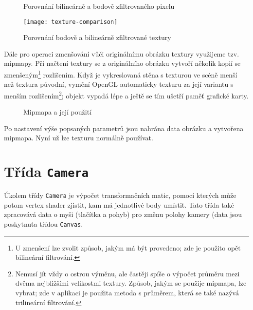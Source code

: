 \documentclass[a4paper, 11pt]{report}
\begin{document}
\begin{figure}[h]
    \centering
    \qquad
    \caption[Porovnání bodově a bilineárně zfiltrovaného pixelu]{Porovnání bilineárně a bodově zfiltrovaného pixelu~\cite{pic:colorfilter}}
\end{figure}
\begin{figure}[H]
    \centering
    \texttt{[image: texture-comparison]}
    \caption[Porovnání bodově a bilineárně zfiltrované textury]{Porovnání bodově a bilineárně zfiltrované textury~\cite{pic:texfilter}}
\end{figure}

Dále pro operaci zmenšování vůči originálnímu obrázku textury využijeme tzv. mipmapy. Při načtení textury se z originálního obrázku vytvoří několik kopií se zmenšeným\footnote{U zmenšení lze zvolit způsob, jakým má být provedeno; zde je použito opět bilineární filtrování.} rozlišením. Když je vykreslovaná stěna s texturou ve scéně menší než textura původní, vymění OpenGL automaticky texturu za její variantu s menším rozlišením\footnote{Nemusí jít vždy o ostrou výměnu, ale častěji spíše o výpočet průměru mezi dvěma nejbližšími velikostmi textury. Způsob, jakým se použije mipmapa, lze vybrat; zde v aplikaci je použita metoda s průměrem, která se také nazývá trilineární filtrování.}; objekt vypadá lépe a ještě se tím ušetří paměť grafické karty.

\begin{figure}[h]
    \centering
    \qquad
    \caption{Mipmapa a její použití}
\end{figure}

Po nastavení výše popsaných parametrů jsou nahrána data obrázku a vytvořena mipmapa. Nyní už lze texturu normálně používat.

\section{\label{kamera}Třída \texttt{Camera}}
Úkolem třídy \texttt{Camera} je výpočet transformačních matic, pomocí kterých může potom vertex shader zjistit, kam má jednotlivé body umístit. Tato třída také zpracovává data o myši (tlačítka a pohyb) pro změnu polohy kamery (data jsou poskytnuta třídou \texttt{Canvas}.
\end{document}

